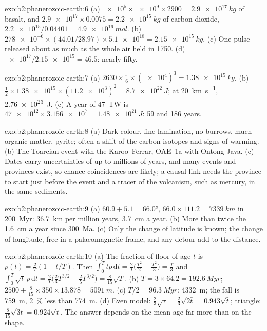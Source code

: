 \begin{solution}{exo:b2:phanerozoic-earth:6}
(a) $\num{e5} \times \num{e9} \times 2900 = \qty{2.9e17}{kg}$ of basalt, and $\num{2.9e17}
\times 0.0075 = \qty{2.2e15}{kg}$ of carbon dioxide, $\num{2.2e15}/0.04401 = \qty{4.9e16}{mol}$.
(b) $\num{278e-6} \times (44.01/28.97) \times \num{5.1e18} = \qty{2.15e15}{kg}$. (c) One pulse
released about as much as the whole air held in 1750. (d) $\num{e17}/\num{2.15e15} = 46.5$: nearly fifty.
\end{solution}

\begin{solution}{exo:b2:phanerozoic-earth:7}
(a) $2630 \times \frac{\pi}{6} \times (\num{e4})^3 = \qty{1.38e15}{kg}$. (b) $\tfrac12 \times
\num{1.38e15} \times (\num{11.2e3})^2 = \qty{8.7e22}{J}$; at \qty{20}{km.s^{-1}},
\qty{2.76e23}{J}. (c) A year of \qty{47}{TW} is $\num{47e12} \times \num{3.156e7} =
\qty{1.48e21}{J}$: 59 and 186 years.
\end{solution}

\begin{solution}{exo:b2:phanerozoic-earth:8}
(a) Dark colour, fine lamination, no burrows, much organic matter, pyrite; often a shift of the
carbon isotopes and signs of warming. (b) The Toarcian event with the Karoo--Ferrar, OAE~1a with
Ontong Java. (c) Dates carry uncertainties of up to millions of years, and many events and
provinces exist, so chance coincidences are likely; a causal link needs the province to start
just before the event and a tracer of the volcanism, such as mercury, in the same sediments.
\end{solution}

\begin{solution}{exo:b2:phanerozoic-earth:9}
(a) $60.9 + 5.1 = \ang{66.0}$, $66.0 \times 111.2 = \qty{7339}{km}$ in \qty{200}{Myr}:
\qty{36.7}{km} per million years, \qty{3.7}{cm} a year. (b) More than twice the
\qty{1.6}{cm} a year since \qty{300}{Ma}. (c) Only the change of latitude is known; the change of
longitude, free in a palaeomagnetic frame, and any detour add to the distance.
\end{solution}

\begin{solution}{exo:b2:phanerozoic-earth:10}
(a) The fraction of floor of age $t$ is $p(t) = \frac2T(1 - t/T)$. Then $\int_0^T tp\,\mathrm{d}t =
\frac2T\bigl(\frac{T^2}2 - \frac{T^2}3\bigr) = \frac T3$ and $\int_0^T \sqrt t\,p\,\mathrm{d}t =
\frac2T\bigl(\frac23 T^{3/2} - \frac25 T^{3/2}\bigr) = \frac8{15}\sqrt T$. (b) $T = 3 \times 64.2 =
\qty{192.6}{Myr}$; $2500 + \frac8{15} \times 350 \times 13.878 = \qty{5091}{m}$. (c) $T/2 =
\qty{96.3}{Myr}$: \qty{4332}{m}; the fall is \qty{759}{m}, \qty{2}{\percent} less than
\qty{774}{m}. (d) Even model: $\frac23\sqrt\tau = \frac23\sqrt{2\bar t} = 0.943\sqrt{\bar t}$;
triangle: $\frac8{15}\sqrt{3\bar t} = 0.924\sqrt{\bar t}$. The answer depends on the mean age far
more than on the shape.
\end{solution}

